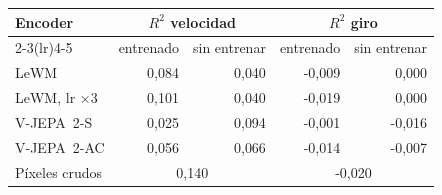 \begin{tabular}{lrrrr}
\toprule
Encoder & \multicolumn{2}{c}{$R^2$ velocidad} & \multicolumn{2}{c}{$R^2$ giro} \\
\cmidrule(lr){2-3}\cmidrule(lr){4-5}
 & entrenado & sin entrenar & entrenado & sin entrenar \\
\midrule
LeWM & 0{,}084 & 0{,}040 & -0{,}009 & 0{,}000 \\
LeWM, lr $\times3$ & 0{,}101 & 0{,}040 & -0{,}019 & 0{,}000 \\
V-JEPA~2-S & 0{,}025 & 0{,}094 & -0{,}001 & -0{,}016 \\
V-JEPA~2-AC & 0{,}056 & 0{,}066 & -0{,}014 & -0{,}007 \\
\midrule
Píxeles crudos & \multicolumn{2}{c}{0{,}140} & \multicolumn{2}{c}{-0{,}020} \\
\bottomrule
\end{tabular}
